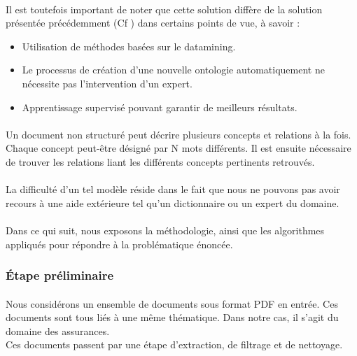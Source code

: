 \documentclass[12pt, a4paper, oneside]{book}
\begin{document}
\paragraph{} 
Il est toutefois important de noter que cette solution diffère de la solution présentée précédemment (Cf ) dans certains points de vue, à savoir : \\
\begin{itemize}
\item Utilisation de méthodes basées sur le datamining.
\item Le processus de création d'une nouvelle ontologie automatiquement ne nécessite pas l'intervention d'un expert.
\item Apprentissage supervisé pouvant garantir de meilleurs résultats.
\end{itemize}

\paragraph{} 
Un document non structuré peut décrire plusieurs concepts et relations à la fois.
Chaque concept peut-être désigné par N mots différents.
Il est ensuite nécessaire de trouver les relations liant les différents concepts pertinents retrouvés.\citep{process1}
\paragraph{} 
La difficulté d'un tel modèle réside dans le fait que nous ne pouvons pas avoir recours à une aide extérieure tel qu'un dictionnaire ou un expert du domaine. 
\paragraph{} 
Dans ce qui suit, nous exposons la méthodologie, ainsi que les algorithmes 
appliqués pour répondre à la problématique énoncée. 

\subsubsection{Étape préliminaire}

\paragraph{} 
Nous considérons un ensemble de documents sous format  PDF en entrée. Ces documents sont tous liés à une même thématique. Dans notre cas, il s'agit du domaine des assurances.\\
Ces documents passent par une étape d'extraction, de filtrage et de nettoyage.
\end{document}
